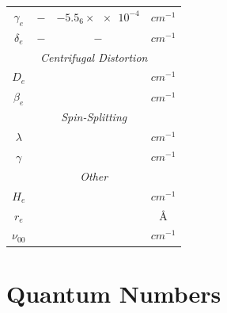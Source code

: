 \documentclass[11pt, twoside, fleqn]{report}
\begin{document}
\begin{table}[H]
\begin{tabular}{cccc}
        $\gamma_e$    & $-$                       & $-5.5_6\times\num{e-4}$ & $\unit{cm^{-1}}$ \\
        $\delta_e$    & $-$                       & $-$                     & $\unit{cm^{-1}}$ \\
        \multicolumn{4}{c}{\textit{Centrifugal Distortion}}                                    \\
        \cmidrule(lr){1-4}
        $D_e$         &                           &                         & $\unit{cm^{-1}}$ \\
        $\beta_e$     &                           &                         & $\unit{cm^{-1}}$ \\
        \multicolumn{4}{c}{\textit{Spin-Splitting}}                                            \\
        \cmidrule(lr){1-4}
        $\lambda$     &                           &                         & $\unit{cm^{-1}}$ \\
        $\gamma$      &                           &                         & $\unit{cm^{-1}}$ \\
        \multicolumn{4}{c}{\textit{Other}}                                                     \\
        \cmidrule(lr){1-4}
        $H_e$         &                           &                         & $\unit{cm^{-1}}$ \\
        $r_e$         &                           &                         & \AA              \\
        $\nu_{00}$    &                           &                         & $\unit{cm^{-1}}$ \\
        \bottomrule
    \end{tabular}
\end{table}

\chapter{Quantum Numbers}
\label{a:quantum_numbers}
\end{document}
